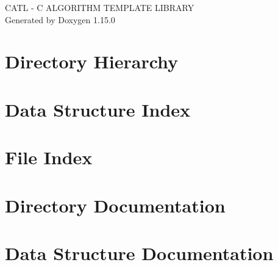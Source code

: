 \documentclass[twoside]{book}
\newcommand{\+}{\discretionary{\mbox{\scriptsize$\hookleftarrow$}}{}{}}
\newcommand{\clearemptydoublepage}{%
    \newpage{\pagestyle{empty}\cleardoublepage}%
  }
\begin{document}
  \raggedbottom
    \hypersetup{pageanchor=false,
                bookmarksnumbered=true,
                pdfencoding=unicode
               }
  \begin{titlepage}
  \vspace*{7cm}
  \begin{center}%
  {\Large CATL -\/ C ALGORITHM TEMPLATE LIBRARY}\\
  \vspace*{1cm}
  {\large Generated by Doxygen 1.15.0}\\
  \end{center}
  \end{titlepage}
  \clearemptydoublepage
  \tableofcontents
  \clearemptydoublepage
  \hypersetup{pageanchor=true}
\chapter{Directory Hierarchy}

\chapter{Data Structure Index}

\chapter{File Index}

\chapter{Directory Documentation}











\chapter{Data Structure Documentation}





\end{document}
